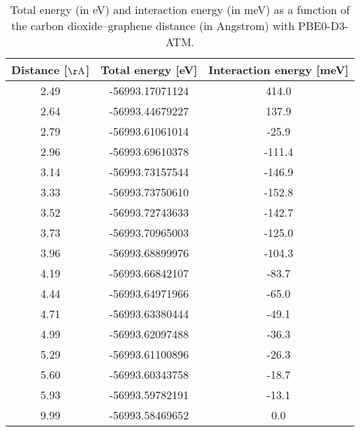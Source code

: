 \begin{table}[h]
\centering
\begin{tabular}{ccc}
\hline
Distance [$\mathrm{\AA}$] & Total energy [eV] & Interaction energy [meV] \\
\hline
2.49 & -56993.17071124 & 414.0 \\
2.64 & -56993.44679227 & 137.9 \\
2.79 & -56993.61061014 & -25.9 \\
2.96 & -56993.69610378 & -111.4 \\
3.14 & -56993.73157544 & -146.9 \\
3.33 & -56993.73750610 & -152.8 \\
3.52 & -56993.72743633 & -142.7 \\
3.73 & -56993.70965003 & -125.0 \\
3.96 & -56993.68899976 & -104.3 \\
4.19 & -56993.66842107 & -83.7 \\
4.44 & -56993.64971966 & -65.0 \\
4.71 & -56993.63380444 & -49.1 \\
4.99 & -56993.62097488 & -36.3 \\
5.29 & -56993.61100896 & -26.3 \\
5.60 & -56993.60343758 & -18.7 \\
5.93 & -56993.59782191 & -13.1 \\
9.99 & -56993.58469652 & 0.0 \\
\hline
\end{tabular}
\caption{Total energy (in eV) and interaction energy (in meV) as a function of the carbon dioxide--graphene distance (in Angstrom) with PBE0-D3-ATM.}
\label{SI_dft_table_PBE0-D3-ATM}
\end{table}